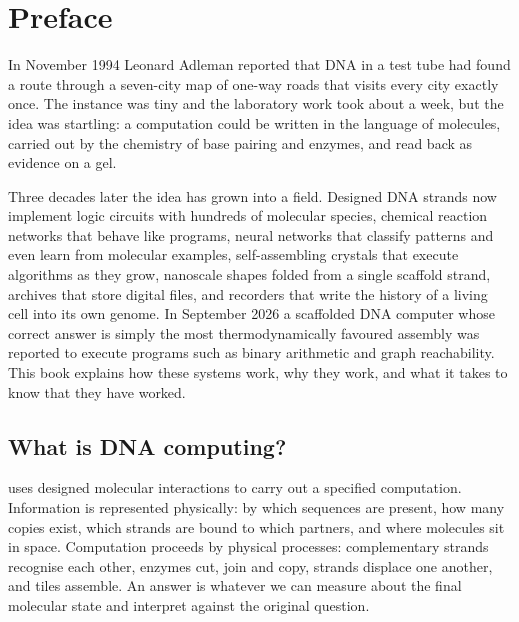 \chapter*{Preface}

In November 1994 Leonard Adleman reported that DNA in a test tube had found a
route through a seven-city map of one-way roads that visits every city exactly
once.\cite{Adleman1994} The instance was tiny and the laboratory work took
about a week, but the idea was startling: a computation could be written
in the language of molecules, carried out by the chemistry of base pairing and
enzymes, and read back as evidence on a gel.

Three decades later the idea has grown into a field. Designed DNA strands now
implement logic circuits with hundreds of molecular species, chemical reaction
networks that behave like programs, neural networks that classify patterns and
even learn from molecular examples, self-assembling crystals that execute
algorithms as they grow, nanoscale shapes folded from a single scaffold strand,
archives that store digital files, and recorders that write the history of a
living cell into its own genome. In September 2026 a scaffolded DNA computer
whose correct answer is simply the most thermodynamically favoured assembly
was reported to execute programs such as binary arithmetic and graph
reachability.\cite{Sterin2026} This book explains how these systems work, why
they work, and what it takes to know that they have worked.

\section*{What is DNA computing?}
 uses designed molecular interactions to carry out a
specified computation. Information is represented physically: by which
sequences are present, how many copies exist, which strands are bound to which
partners, and where molecules sit in space. Computation proceeds by physical
processes: complementary strands recognise each other, enzymes cut, join and
copy, strands displace one another, and tiles assemble. An answer is whatever
we can measure about the final molecular state and interpret against the
original question.


